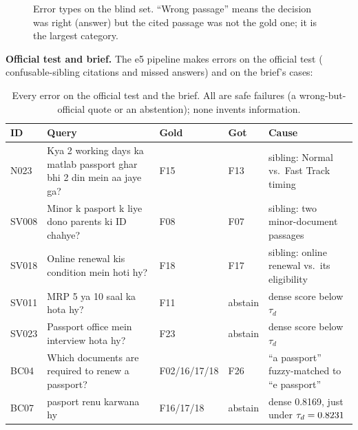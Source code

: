 \documentclass[11pt,a4paper]{article}
\def\addplotcoords#1#2{\expandafter\addplotcoordsi\expandafter{#2}{#1}}
\def\addplotcoordsi#1#2{\addplot[#2] coordinates {#1};}
\begin{document}
\begin{figure}[H]
\centering
{}
\caption{Error types on the blind set. ``Wrong passage'' means the decision was right (answer) but the cited passage was not the
gold one; it is the largest category.}
\label{fig:errors}
\end{figure}

\textbf{Official test and brief.} The e5 pipeline makes \TestErrors{} errors on the official test (\TestErrSibling{}
confusable-sibling citations and \TestErrMissed{} missed answers) and \BriefErrors{} on the brief's cases:

\begin{table}[H]
\centering\small
\begin{tabularx}{\textwidth}{@{}l X l l X@{}}
\toprule
ID & Query & Gold & Got & Cause\\
\midrule
N023 & Kya 2 working days ka matlab passport ghar bhi 2 din mein aa jaye ga? & F15 & F13 & sibling: Normal vs.\ Fast Track timing\\
SV008 & Minor k pasport k liye dono parents ki ID chahye? & F08 & F07 & sibling: two minor-document passages\\
SV018 & Online renewal kis condition mein hoti hy? & F18 & F17 & sibling: online renewal vs.\ its eligibility\\
SV011 & MRP 5 ya 10 saal ka hota hy? & F11 & abstain & dense score below $\tau_d$\\
SV023 & Passport office mein interview hota hy? & F23 & abstain & dense score below $\tau_d$\\
BC04 & Which documents are required to renew a passport? & F02/16/17/18 & F26 & ``a passport'' fuzzy-matched to ``e passport''\\
BC07 & pasport renu karwana hy & F16/17/18 & abstain & dense 0.8169, just under $\tau_d=0.8231$\\
\bottomrule
\end{tabularx}
\caption{Every error on the official test and the brief. All are safe failures (a wrong-but-official quote or an abstention); none
invents information.}
\label{tab:errors}
\end{table}
\end{document}
